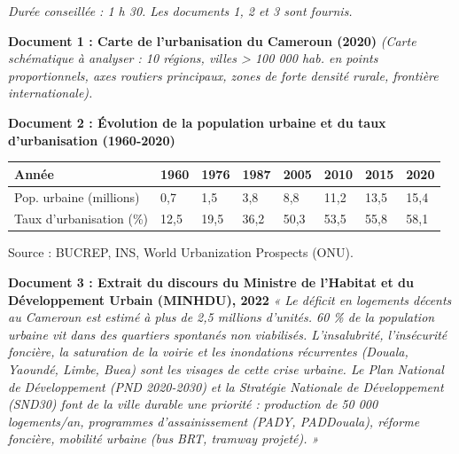 \documentclass[11pt]{article}
\newcounter{popsec}
\newcounter{popsub}
\newcommand{\courssub}[1]{%
  \stepcounter{popsub}%
  \par\vspace{9pt}\noindent{\popxbold\fontsize{11.5}{13}\selectfont\color{popink}{\color{poporange}\thepopsec.\thepopsub}\hspace{6pt}#1}\par\nopagebreak\vspace{4pt}
}
\begin{document}
\courssub{Je me prépare au Bac}

\begin{exercice}
\emph{Durée conseillée : 1 h 30. Les documents 1, 2 et 3 sont fournis.}

\textbf{Document 1 : Carte de l'urbanisation du Cameroun (2020)}
\emph{(Carte schématique à analyser : 10 régions, villes > 100 000 hab. en points proportionnels, axes routiers principaux, zones de forte densité rurale, frontière internationale).}

\textbf{Document 2 : Évolution de la population urbaine et du taux d'urbanisation (1960-2020)}
\begin{center}
\begin{tabularx}{\linewidth}{|l|X|X|X|X|X|X|X|}\hline
\textbf{Année} & \textbf{1960} & \textbf{1976} & \textbf{1987} & \textbf{2005} & \textbf{2010} & \textbf{2015} & \textbf{2020} \\ \hline
Pop. urbaine (millions) & 0,7 & 1,5 & 3,8 & 8,8 & 11,2 & 13,5 & 15,4 \\ \hline
Taux d'urbanisation (\%) & 12,5 & 19,5 & 36,2 & 50,3 & 53,5 & 55,8 & 58,1 \\ \hline
\end{tabularx}
\end{center}
Source : BUCREP, INS, World Urbanization Prospects (ONU).

\textbf{Document 3 : Extrait du discours du Ministre de l'Habitat et du Développement Urbain (MINHDU), 2022}
\emph{« Le déficit en logements décents au Cameroun est estimé à plus de 2,5 millions d'unités. 60 \% de la population urbaine vit dans des quartiers spontanés non viabilisés. L'insalubrité, l'insécurité foncière, la saturation de la voirie et les inondations récurrentes (Douala, Yaoundé, Limbe, Buea) sont les visages de cette crise urbaine. Le Plan National de Développement (PND 2020-2030) et la Stratégie Nationale de Développement (SND30) font de la ville durable une priorité : production de 50 000 logements/an, programmes d'assainissement (PADY, PADDouala), réforme foncière, mobilité urbaine (bus BRT, tramway projeté). »}


\end{exercice}
\end{document}
